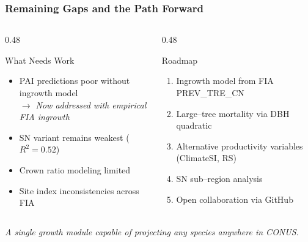 \documentclass[aspectratio=169]{beamer}
\begin{document}
\begin{frame}
\frametitle{Remaining Gaps and the Path Forward}

\begin{columns}[T]
\begin{column}{0.48\textwidth}
\begin{block}{\centering What Needs Work}
\begin{itemize}
  \item PAI predictions poor without ingrowth model\\
    {\small\color{fvsgreen}\textit{$\rightarrow$ Now addressed with empirical FIA ingrowth}}
  \item SN variant remains weakest ($R^2 = 0.52$)
  \item Crown ratio modeling limited
  \item Site index inconsistencies across FIA
\end{itemize}
\end{block}
\end{column}

\begin{column}{0.48\textwidth}
\begin{block}{\centering Roadmap}
\begin{enumerate}
  \item Ingrowth model from FIA PREV\_TRE\_CN \checkmark
  \item Large--tree mortality via DBH quadratic \checkmark
  \item Alternative productivity variables (ClimateSI, RS)
  \item SN sub--region analysis
  \item Open collaboration via GitHub
\end{enumerate}
\end{block}
\end{column}
\end{columns}

\vspace{0.5cm}
\begin{center}
\colorbox{fvsdark}{\parbox{0.7\textwidth}{\centering\color{fvsmoss}\itshape\large A single growth module capable of projecting any species anywhere in CONUS.}}
\end{center}
\end{frame}
\end{document}
